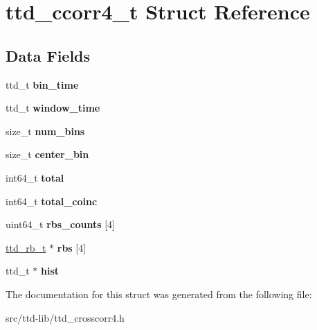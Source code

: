 \hypertarget{structttd__ccorr4__t}{}\section{ttd\+\_\+ccorr4\+\_\+t Struct Reference}
\label{structttd__ccorr4__t}
\subsection*{Data Fields}
\begin{DoxyCompactItemize}
\item 
\hypertarget{structttd__ccorr4__t_aa45984bd71b410822eb4963fd5f6bc22}{}ttd\+\_\+t {\bfseries bin\+\_\+time}\label{structttd__ccorr4__t_aa45984bd71b410822eb4963fd5f6bc22}

\item 
\hypertarget{structttd__ccorr4__t_ad7e321cafe8a31f0456280e765551a58}{}ttd\+\_\+t {\bfseries window\+\_\+time}\label{structttd__ccorr4__t_ad7e321cafe8a31f0456280e765551a58}

\item 
\hypertarget{structttd__ccorr4__t_a6afe1df41b42ab4257da65c27f6ecd7d}{}size\+\_\+t {\bfseries num\+\_\+bins}\label{structttd__ccorr4__t_a6afe1df41b42ab4257da65c27f6ecd7d}

\item 
\hypertarget{structttd__ccorr4__t_a002ea5a0718396307671f816ef705863}{}size\+\_\+t {\bfseries center\+\_\+bin}\label{structttd__ccorr4__t_a002ea5a0718396307671f816ef705863}

\item 
\hypertarget{structttd__ccorr4__t_aa4ac207111b26294ea3edcfaa9389e06}{}int64\+\_\+t {\bfseries total}\label{structttd__ccorr4__t_aa4ac207111b26294ea3edcfaa9389e06}

\item 
\hypertarget{structttd__ccorr4__t_aebba61259ee8397b240a66cce4440fcd}{}int64\+\_\+t {\bfseries total\+\_\+coinc}\label{structttd__ccorr4__t_aebba61259ee8397b240a66cce4440fcd}

\item 
\hypertarget{structttd__ccorr4__t_acc248298766e5c2e692b422b4384e643}{}uint64\+\_\+t {\bfseries rbs\+\_\+counts} \mbox{[}4\mbox{]}\label{structttd__ccorr4__t_acc248298766e5c2e692b422b4384e643}

\item 
\hypertarget{structttd__ccorr4__t_a77f86ee3b0e8748c96055ea29761dac6}{}\hyperlink{structttd__rb__t}{ttd\+\_\+rb\+\_\+t} $\ast$ {\bfseries rbs} \mbox{[}4\mbox{]}\label{structttd__ccorr4__t_a77f86ee3b0e8748c96055ea29761dac6}

\item 
\hypertarget{structttd__ccorr4__t_a08d0cbe36a8a9b11a64d2ced07040949}{}ttd\+\_\+t $\ast$ {\bfseries hist}\label{structttd__ccorr4__t_a08d0cbe36a8a9b11a64d2ced07040949}

\end{DoxyCompactItemize}


The documentation for this struct was generated from the following file\+:\begin{DoxyCompactItemize}
\item 
src/ttd-\/lib/ttd\+\_\+crosscorr4.\+h\end{DoxyCompactItemize}

